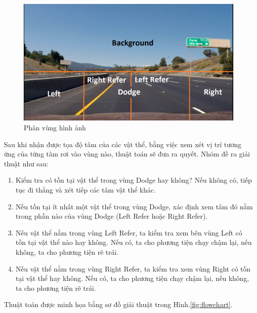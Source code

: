 \documentclass[a4paper,10pt]{article}
\begin{document}
		\begin{figure}[h]
 		\label{fig:zones}
		\begin{center}
		\includegraphics[width=.8\textwidth]{image/zones.png} %
		\caption{Phân vùng hình ảnh}
		\end{center}
		\end{figure}	

Sau khi nhận được tọa độ tâm của các vật thể, bằng việc xem xét vị trí tương ứng của từng tâm rơi vào vùng nào, thuật toán sẽ đưa ra quyết. Nhóm đề ra giải thuật như sau:

	\begin{enumerate}
		\item Kiểm tra có tồn tại vật thể trong vùng Dodge hay không? Nếu không có, tiếp tục đi thẳng và xét tiếp các tâm vật thể khác.
		\item Nếu tồn tại ít nhất một vật thể trong vùng Dodge, xác định xem tâm đó nằm trong phần nào của vùng Dodge (Left Refer hoặc Right Refer).
		\item Nếu vật thể nằm trong vùng Left Refer, ta kiểm tra xem bên vùng Left có tồn tại vật thể nào hay không. Nếu có, ta cho phương tiện chạy chậm lại, nếu không, ta cho phương tiện rẽ trái.
		\item Nếu vật thể nằm trong vùng Right Refer, ta kiểm tra xem vùng Right có tồn tại vật thể hay không. Nếu có, ta cho phương tiện chạy chậm lại, nếu không, ta cho phương tiện rẽ trái.	
	\end{enumerate}
Thuật toán được minh họa bằng sơ đồ giải thuật trong Hình.\ref{fig:flowchart}.
\end{document}

